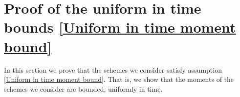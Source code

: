\documentclass[reqno, 11pt]{amsart}
\theoremstyle{plain}
\theoremstyle{definition}
\theoremstyle{remark}
\numberwithin{equation}{section}
\numberwithin{theorem}{section}
\DeclareMathOperator{\bigo}{O}
\begin{document}
{%








\section{Proof of the uniform in time bounds \ref{Uniform in time moment bound}}\label{sec:proof of uniform moment bounds}
In this section we prove that the schemes we consider satisfy assumption \ref{Uniform in time moment bound}. That is, we show that the moments of the schemes we consider are bounded, uniformly in time. 
}
\end{document}
